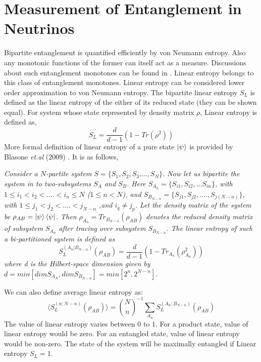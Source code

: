 \documentclass[12pt,a4paper]{report}
\begin{document}
\section{Measurement of Entanglement in Neutrinos}
Bipartite entanglement is quantified efficiently by von Neumann entropy. Also any monotonic functions of the former can itself act as a measure. Discussions about such entanglement monotones can be found in \cite{horodecki}\cite{amico}. Linear entropy belongs to this class of entanglement monotones. Linear entropy can be considered lower order approximation to von Neumann entropy. The bipartite linear entropy $S_{L}$ is defined as the linear entropy of the either of its reduced state (they can be shown equal). For system whose state represented by density matrix $\rho$, Linear entropy is defined as,
\begin{equation}
S_{L} = \frac{d}{d-1}(1-Tr(\rho^{2}))
\end{equation}
More formal definition of linear entropy of a pure state $\ket{\psi}$ is provided by Blasone \emph{et.al} (2009) . It is as follows,\par
\emph{Consider a $N$-partite system $S=\{S_{1},S_{2},S_{3}....,S_{N}\}$. Now let us bipartite the system in to two-subsystems $S_{A}$ and $S_{B}$. Here $S_{A_{n}}=\{S_{i1},S_{i2},...S_{in}\}$, with $1\leq i_{1}<i_{2}<....<i_{n}\leq N$ ($1 \leq n < N$), and $S_{B_{N-n}} =\{S_{j1},S_{j2},....,S_{j(N-n)}\}$, with $1\leq j_{1}< j_{2} < ....<j_{N-n}$ ,and $i_{q} \neq j_{p}$. Let the density matrix of the system be $\rho_{AB}=\ket{\psi}\bra{\psi}$. Then $\rho_{A_{n}}= Tr_{B_{N-n}}(\rho_{AB})$ denotes the reduced density matrix of subsystem $S_{A_{n}}$ after tracing over subsystem $S_{B_{N-n}}$. The linear entropy of such a bi-partitioned system is defined as
\begin{equation}
\label{eq:25}
    S_{L}^{(A_{n}|B_{N-n})} (\rho_{AB}) = \frac{d}{d-1}\left(1-Tr_{A_{n}}(\rho_{A_{n}}^{2})\right)
\end{equation}
where d is the Hilbert-space dimension given by $d=min[dim S_{A_{N}},dim S_{B_{N-n}}]= min[2^{n},2^{N-n}]$}\cite{blasone2009}.\par

We can also define average linear entropy as:
\begin{equation}
\langle S_{L}^{(n:N-n)}(\rho_{AB})\rangle= \binom{N}{n}^{-1} \sum_{A_{n}} S_{L}^{(A_{n};B_{N-n})}(\rho_{AB})
\end{equation}
The value of linear entropy varies between $0$ to $1$. For a product state, value of linear entropy would be zero. For an entangled state, value of linear entropy would be non-zero. The state of the system will be maximally entangled if Linear entropy $S_{L}=1$.
\end{document}

